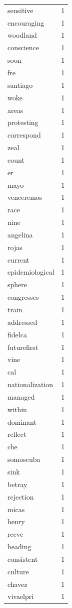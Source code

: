 \begin{tabular}{lr}
sensitive & 1 \\
encouraging & 1 \\
woodland & 1 \\
conscience & 1 \\
soon & 1 \\
fre & 1 \\
santiago & 1 \\
woke & 1 \\
areas & 1 \\
protesting & 1 \\
correspond & 1 \\
zeal & 1 \\
count & 1 \\
er & 1 \\
mayo & 1 \\
venceremos & 1 \\
race & 1 \\
nine & 1 \\
angelina & 1 \\
rojas & 1 \\
current & 1 \\
epidemiological & 1 \\
sphere & 1 \\
congresses & 1 \\
train & 1 \\
addressed & 1 \\
fidelca & 1 \\
futurefirst & 1 \\
vine & 1 \\
cal & 1 \\
nationalization & 1 \\
managed & 1 \\
within & 1 \\
dominant & 1 \\
reflect & 1 \\
che & 1 \\
somoscuba & 1 \\
sink & 1 \\
betray & 1 \\
rejection & 1 \\
micas & 1 \\
henry & 1 \\
reeve & 1 \\
heading & 1 \\
consistent & 1 \\
culture & 1 \\
chavez & 1 \\
vivaelpri & 1 \\

\end{tabular}
